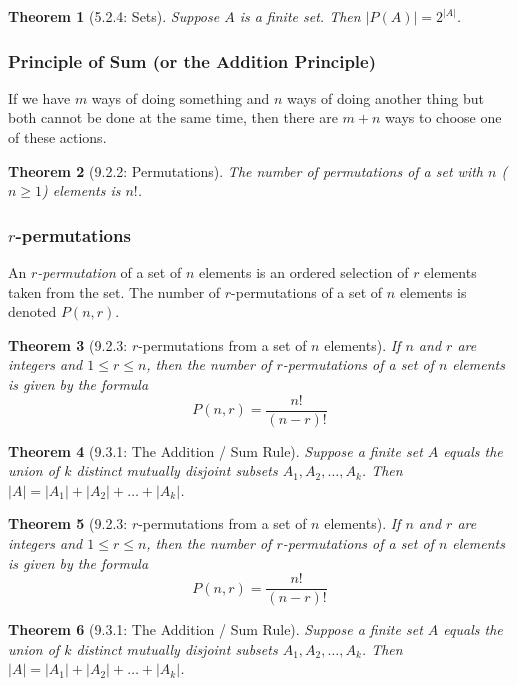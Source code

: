 \documentclass{article}
\theoremstyle{plain}
\newtheorem{theorem}{Theorem}[section]
\theoremstyle{definition}
\theoremstyle{remark}
\begin{document}
\begin{theorem}[5.2.4: Sets]
    Suppose $A$ is a finite set. Then $|P(A)| = 2^{|A|}$.
\end{theorem}

\subsubsection*{Principle of Sum (or the Addition Principle)}
If we have $m$ ways of doing something and $n$ ways of doing another thing but both cannot be done at the same time, then there are $m+n$ ways to choose one of these actions.

\begin{theorem}[9.2.2: Permutations]
    The number of permutations of a set with $n$ ($n \geq 1$) elements is $n!$.
\end{theorem}

\subsubsection*{$r$-permutations}
An \emph{$r$-permutation} of a set of $n$ elements is an ordered selection of $r$ elements taken from the set. The number of $r$-permutations of a set of $n$ elements is denoted $P(n,r)$.

\begin{theorem}[9.2.3: $r$-permutations from a set of $n$ elements]
    If $n$ and $r$ are integers and $1 \leq r \leq n$, then the number of $r$-permutations of a set of $n$ elements is given by the formula
    \[ P(n,r) = \frac{n!}{(n-r)!} \]
\end{theorem}

\begin{theorem}[9.3.1: The Addition / Sum Rule]
    Suppose a finite set $A$ equals the union of $k$ distinct mutually disjoint subsets $A_1, A_2, \dots, A_k$. Then $|A| = |A_1| + |A_2| + \dots + |A_k|$.
\end{theorem}

\begin{theorem}[9.2.3: $r$-permutations from a set of $n$ elements]
    If $n$ and $r$ are integers and $1 \leq r \leq n$, then the number of $r$-permutations of a set of $n$ elements is given by the formula
    \[ P(n,r) = \frac{n!}{(n-r)!} \]
\end{theorem}
 
\begin{theorem}[9.3.1: The Addition / Sum Rule]
    Suppose a finite set $A$ equals the union of $k$ distinct mutually disjoint subsets $A_1, A_2, \dots, A_k$. Then $|A| = |A_1| + |A_2| + \dots + |A_k|$.
\end{theorem}
 
\end{document}

